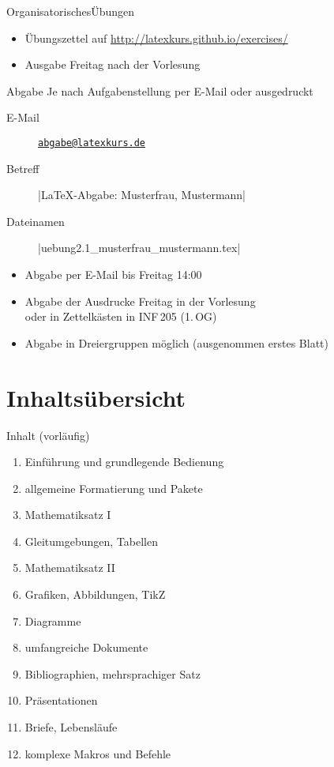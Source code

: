 \documentclass[
	vorläufig=false,
	datum=2016-10-21,
	titel={Einführung und grundlegende Bedienung},
	web=true,
]{../tex/latexkurs-slides}
\begin{document}
\begin{frame}[fragile, t]{Organisatorisches}{Übungen}
		\begin{itemize}
			\item Übungszettel auf \url{http://latexkurs.github.io/exercises/}
			\item Ausgabe Freitag nach der Vorlesung
		\end{itemize}
	\pause
	\begin{block}{Abgabe}
	Je nach Aufgabenstellung per E-Mail oder ausgedruckt
		\begin{description}
			\item[E-Mail] \href{mailto:abgabe@latexkurs.de}{\texttt{abgabe@latexkurs.de}}\\
			\item[Betreff] |LaTeX-Abgabe: Musterfrau, Mustermann|\\
			\item[Dateinamen] |uebung2.1_musterfrau_mustermann.tex|
		\end{description}
		\vspace{-1ex}
		\begin{itemize}
			\item Abgabe per E-Mail bis Freitag 14:00
			\item Abgabe der Ausdrucke Freitag in der Vorlesung\\oder in Zettelkästen in INF\,205 (1.\,OG)
			\item Abgabe in Dreiergruppen möglich (ausgenommen erstes Blatt)
		\end{itemize}
	\end{block}
\end{frame}





\section{Inhaltsübersicht}

\begin{frame}{Inhalt (vorläufig)}
	\begin{enumerate}
		\item Einführung und grundlegende Bedienung
		\item allgemeine Formatierung und Pakete
		\item Mathematiksatz I
		\item Gleitumgebungen, Tabellen
		\item Mathematiksatz II
		\item Grafiken, Abbildungen, TikZ
		\item Diagramme
		\item umfangreiche Dokumente
		\item Bibliographien, mehrsprachiger Satz
		\item Präsentationen
		\item Briefe, Lebensläufe
		\item komplexe Makros und Befehle
	\end{enumerate}
\end{frame}
\end{document}
